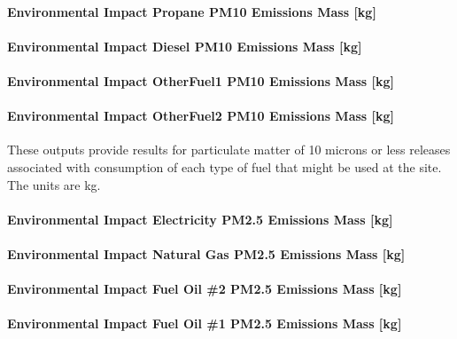 \paragraph{Environmental Impact Propane PM10 Emissions Mass {[}kg{]}}\label{environmental-impact-propane-pm10-emissions-mass-kg}

\paragraph{Environmental Impact Diesel PM10 Emissions Mass {[}kg{]}}\label{environmental-impact-diesel-pm10-emissions-mass-kg}

\paragraph{Environmental Impact OtherFuel1 PM10 Emissions Mass {[}kg{]}}\label{environmental-impact-otherfuel1-pm10-emissions-mass-kg}

\paragraph{Environmental Impact OtherFuel2 PM10 Emissions Mass {[}kg{]}}\label{environmental-impact-otherfuel2-pm10-emissions-mass-kg}

These outputs provide results for particulate matter of 10 microns or less releases associated with consumption of each type of fuel that might be used at the site.~ The units are kg.

\paragraph{Environmental Impact Electricity PM2.5 Emissions Mass {[}kg{]}}\label{environmental-impact-electricity-pm2.5-emissions-mass-kg}

\paragraph{Environmental Impact Natural Gas PM2.5 Emissions Mass {[}kg{]}}\label{environmental-impact-natural-gas-pm2.5-emissions-mass-kg}

\paragraph{Environmental Impact Fuel Oil \#2 PM2.5 Emissions Mass {[}kg{]}}\label{environmental-impact-fuel-oil-2-pm2.5-emissions-mass-kg}

\paragraph{Environmental Impact Fuel Oil \#1 PM2.5 Emissions Mass {[}kg{]}}\label{environmental-impact-fuel-oil-1-pm2.5-emissions-mass-kg}

